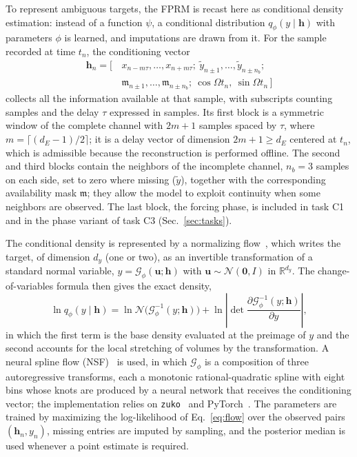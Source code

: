 To represent ambiguous targets, the FPRM is recast here as conditional density estimation: instead of a function $\psi$, a conditional distribution $q_\phi(y\mid\mathbf h)$ with parameters $\phi$ is learned, and imputations are drawn from it. For the sample recorded at time $t_n$, the conditioning vector
\begin{equation}
\begin{split}
\mathbf h_n = \bigl[\,&x_{n-m\tau},\dots,x_{n+m\tau};\ \tilde y_{n\pm1},\dots,\tilde y_{n\pm n_b};\\
&\mathfrak m_{n\pm1},\dots,\mathfrak m_{n\pm n_b};\ \cos\Omega t_n,\ \sin\Omega t_n\,\bigr]
\end{split}
\label{eq:context}
\end{equation}
collects all the information available at that sample, with subscripts counting samples and the delay $\tau$ expressed in samples. Its first block is a symmetric window of the complete channel with $2m+1$ samples spaced by $\tau$, where $m=\lceil(d_E-1)/2\rceil$; it is a delay vector of dimension $2m+1\ge d_E$ centered at $t_n$, which is admissible because the reconstruction is performed offline. The second and third blocks contain the neighbors of the incomplete channel, $n_b=3$ samples on each side, set to zero where missing ($\tilde y$), together with the corresponding availability mask $\mathfrak m$; they allow the model to exploit continuity when some neighbors are observed. The last block, the forcing phase, is included in task C1 and in the phase variant of task C3 (Sec.~\ref{sec:tasks}).

The conditional density is represented by a normalizing flow~\cite{Papamakarios2021}, which writes the target, of dimension $d_y$ (one or two), as an invertible transformation of a standard normal variable, $y=\mathcal G_\phi(\mathbf u;\mathbf h)$ with $\mathbf u\sim\mathcal N(\mathbf 0,I)$ in $\mathbb R^{d_y}$. The change-of-variables formula then gives the exact density,
\begin{equation}
\ln q_\phi(y\mid\mathbf h) = \ln\mathcal N\bigl(\mathcal G_\phi^{-1}(y;\mathbf h)\bigr) + \ln\left|\det\frac{\partial \mathcal G_\phi^{-1}(y;\mathbf h)}{\partial y}\right| ,
\label{eq:flow}
\end{equation}
in which the first term is the base density evaluated at the preimage of $y$ and the second accounts for the local stretching of volumes by the transformation. A neural spline flow (NSF)~\cite{Durkan2019} is used, in which $\mathcal G_\phi$ is a composition of three autoregressive transforms, each a monotonic rational-quadratic spline with eight bins whose knots are produced by a neural network that receives the conditioning vector; the implementation relies on \texttt{zuko}~\cite{zuko} and PyTorch~\cite{Paszke2019}. The parameters are trained by maximizing the log-likelihood of Eq.~\eqref{eq:flow} over the observed pairs $(\mathbf h_n,y_n)$, missing entries are imputed by sampling, and the posterior median is used whenever a point estimate is required.

